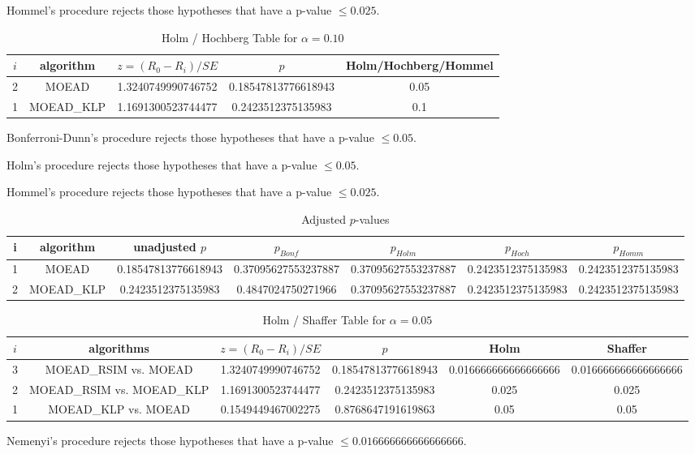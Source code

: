 \documentclass[a4paper,10pt]{article}
\begin{document}
\begin{landscape}
Hommel's procedure rejects those hypotheses that have a p-value $\le0.025$.


\begin{table}[!htp]
\centering\tiny
\caption{Holm / Hochberg Table for $\alpha=0.10$}
\begin{tabular}{ccccc}
$i$&algorithm&$z=(R_0 - R_i)/SE$&$p$&Holm/Hochberg/Hommel\\
\hline
2&MOEAD&1.3240749990746752&0.18547813776618943&0.05\\
1&MOEAD_KLP&1.1691300523744477&0.2423512375135983&0.1\\
\hline
\end{tabular}
\end{table}
Bonferroni-Dunn's procedure rejects those hypotheses that have a p-value $\le0.05$.


Holm's procedure rejects those hypotheses that have a p-value $\le0.05$.


Hommel's procedure rejects those hypotheses that have a p-value $\le0.025$.


\begin{table}[!htp]
\centering\tiny
\caption{Adjusted $p$-values}
\begin{tabular}{ccccccc}
i&algorithm&unadjusted $p$&$p_{Bonf}$&$p_{Holm}$&$p_{Hoch}$&$p_{Homm}$\\
\hline
1&MOEAD&0.18547813776618943&0.37095627553237887&0.37095627553237887&0.2423512375135983&0.2423512375135983\\
2&MOEAD_KLP&0.2423512375135983&0.4847024750271966&0.37095627553237887&0.2423512375135983&0.2423512375135983\\
\hline
\end{tabular}
\end{table}

\begin{table}[!htp]
\centering\tiny
\caption{Holm / Shaffer Table for $\alpha=0.05$}
\begin{tabular}{cccccc}
$i$&algorithms&$z=(R_0 - R_i)/SE$&$p$&Holm&Shaffer\\
\hline
3&MOEAD_RSIM vs. MOEAD&1.3240749990746752&0.18547813776618943&0.016666666666666666&0.016666666666666666\\
2&MOEAD_RSIM vs. MOEAD_KLP&1.1691300523744477&0.2423512375135983&0.025&0.025\\
1&MOEAD_KLP vs. MOEAD&0.1549449467002275&0.8768647191619863&0.05&0.05\\
\hline
\end{tabular}
\end{table}
Nemenyi's procedure rejects those hypotheses that have a p-value $\le0.016666666666666666$.



\end{landscape}
\end{document}
